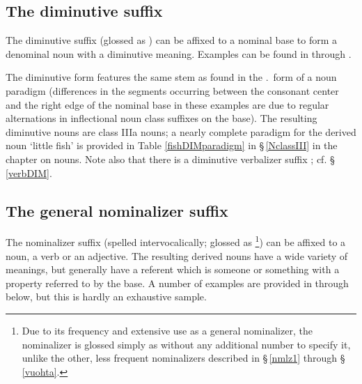 \subsection{The diminutive suffix }\label{dim}
The diminutive suffix  (glossed as ) can be affixed to a nominal base to form a denominal noun with a diminutive meaning. Examples can be found in  through . 
\ea\label{DIMex1}
\z
\ea\label{DIMex2}
\z
\ea\label{DIMex3}
\z
\ea\label{DIMex4}
\z
\ea\label{DIMex5}
\z
\ea\label{DIMex6}
\z

The diminutive form features the same stem as found in the \NOMs.\PLs\ form of a noun paradigm (differences in the segments occurring between the consonant center and the right edge of the nominal base in these examples are due to regular alternations in inflectional noun class suffixes on the base). %
The resulting diminutive nouns are class IIIa nouns; a nearly complete paradigm for the derived noun  ‘little fish’ is provided in Table \vref{fishDIMparadigm} in §\,\ref{NclassIII} in the chapter on nouns. Note also that there is a diminutive verbalizer suffix ; cf. §\,\ref{verbDIM}. 


\subsection{The general nominalizer suffix }\label{nmlz2}
The nominalizer suffix  (spelled  intervocalically; glossed as \footnote{Due to its frequency and extensive use as a general nominalizer, the nominalizer  is glossed simply as  without any additional number to specify it, unlike the other, less frequent nominalizers described in §\,\ref{nmlz1} through §\,\ref{vuohta}.}) 
can be affixed to a noun, a verb or an adjective. The resulting derived nouns have a wide variety of meanings, but generally have a referent which is someone or something with a property referred to by the base. %
A number of examples are provided in  through  below, but this is hardly an exhaustive sample. %

